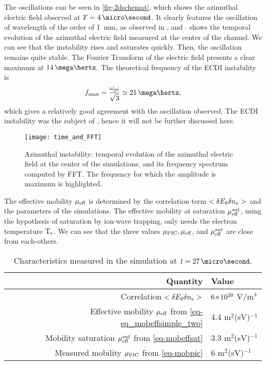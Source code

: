   The oscillations can be seen in \cref{fig-2dschemat}, which shows the azimuthal electric field observed at $T=4\,\micro\second$.
  It clearly features the oscillation of wavelength of the order of 1~mm, as observed in \citet{heron2013}, and \citet{janhunen2018}.
   shows the temporal evolution of the azimuthal electric field measured at the center of the channel.
  We can see that the instability rises and saturates quickly.
  Then, the oscillation remains quite stable.
  The Fourier Transform of the electric field presents a clear maximum at $14\,\mega\hertz$.
  The theoretical frequency of the \ac{ECDI} instability is \citep{lafleur2017}
  \begin{equation} \label{eq-maxfeq}
    f_{\rm max} = \frac{\omega_{pi}}{\sqrt{3}} \simeq 21 \,\mega\hertz,
  \end{equation}
  which gives a relatively good agreement with the oscillation observed.
  The \ac{ECDI} instability was the subject of , hence it will not be further discussed here.
  
  
  \begin{figure}[hbt]
    \centering
    \texttt{[image: time\_and\_FFT]}
    \caption{Azimuthal instability\string: temporal evolution of the azimuthal electric field at the center of the simulations, and its frequency spectrum computed by \acs{FFT}. The frequency for which the amplitude is maximum is highlighted.}
    \label{fig-exampleECDI}
  \end{figure}
  
  The effective mobility $\mu_{\mathrm{eff}}$ is determined by the correlation term $<\delta E_{\theta} \delta n_e>$ and the parameters of the simulations.
  The effective mobility at saturation $\mu_{\mathrm{eff}}^{sat}$, using the hypothesis of saturation by ion-wave trapping, only needs the electron temperature $\mathrm{T_e}$.
  We can see that the three values $\mu_{\mathrm{PIC}}, \mu_{\mathrm{eff}}$, and $\mu_{\mathrm{eff}}^{sat}$ are close from each-others.
  
  \begin{table}[!hbt]
    \centering
    \caption{Characteristics  measured in the simulation at $t=27\,\micro\second$.}
    \label{tab-canonical_mobility}
    \begin{tabular}{@{} r l @{}} \toprule
    Quantity & Value \\ \midrule
    Correlation $<\delta E_{\theta} \delta n_e>$ & ${{6}{\times}10^{20}}$ V/m${^4}$ \\
    Effective mobility $\mu_{\mathrm{eff}}$ from \cref{eq-eq_mobeffsimple_two} & 4.4 m$^2$(sV)$^{-1}$ \\
    Mobility saturation $\mu_{\mathrm{eff}}^{sat}$ from \cref{eq-mobeffsat} & 3.3 m$^2$(sV)$^{-1}$ \\
    Measured mobility $\mu_{\mathrm{PIC}}$ from \cref{eq-mobpic} & 6 m$^2$(sV)$^{-1}$\\
    \bottomrule
    \end{tabular}
  \end{table}
  

  
  